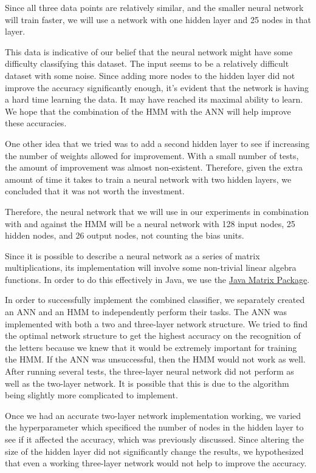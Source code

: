 \documentclass[11pt,letterpaper]{article}
\begin{document}
Since all three data points are relatively similar, and the smaller neural
network will train faster, we will use a network with one hidden layer and 25 nodes
in that layer.

This data is indicative of our belief that the neural network might have some
difficulty classifying this dataset. The input seems to be a relatively
difficult dataset with some noise. Since adding more nodes to the hidden layer
did not improve the accuracy significantly enough, it's evident that the
network is having a hard time learning the data. It may have reached its
maximal ability to learn. We hope that the combination of the HMM with the ANN
will help improve these accuracies.

One other idea that we tried was to add a second hidden layer to see if
increasing the number of weights allowed for improvement. With a small number
of tests, the amount of improvement was almost non-existent. Therefore, given
the extra amount of time it takes to train a neural network with two hidden
layers, we concluded that it was not worth the investment.

Therefore, the neural network that we will use in our experiments in
combination with and against the HMM will be a neural network with 128 input
nodes, 25 hidden nodes, and 26 output nodes, not counting the bias units.

Since it is possible to describe a neural network as a series of matrix multiplications, its
implementation will involve some non-trivial linear algebra functions. In order to do this
effectively in Java, we use the \href{http://math.nist.gov/javanumerics/jama/}{Java Matrix Package}.

In order to successfully implement the combined classifier, we separately
created an ANN and an HMM to independently perform their tasks. The ANN was
implemented with both a two and three-layer network structure. We tried to
find the optimal network structure to get the highest accuracy on the
recognition of the letters because we knew that it would be extremely important
for training the HMM\@. If the ANN was unsuccessful, then the HMM would not work
as well. After running several tests, the three-layer neural network did not
perform as well as the two-layer network. It is possible that this is due to
the algorithm being slightly more complicated to implement.

Once we had an accurate two-layer network implementation working, we varied the
hyperparameter which specificed the number of nodes in the hidden layer to see
if it affected the accuracy, which was previously discussed. Since altering the
size of the hidden layer did not significantly change the results, we
hypothesized that even a working three-layer network would not help to improve
the accuracy.
\end{document}
